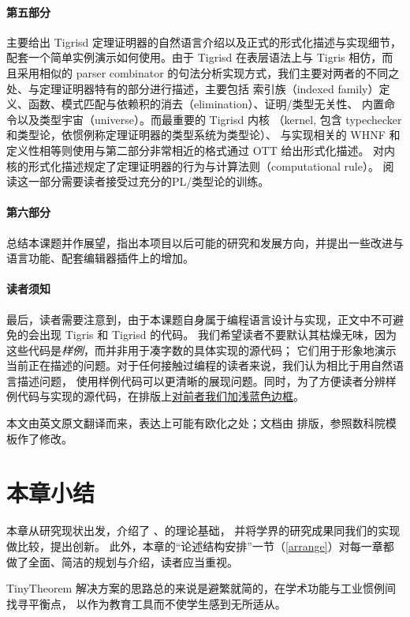 \paragraph{第五部分}主要给出 Tigrisd 定理证明器的自然语言介绍以及正式的形式化描述与实现细节，配套一个简单实例演示如何使用。由于 Tigrisd 在表层语法上与 Tigris 相仿，而且采用相似的
parser combinator 的句法分析实现方式，我们主要对两者的不同之处、与定理证明器特有的部分进行描述，主要包括
索引族（indexed family）定义、函数、模式匹配与依赖积的消去（elimination）、证明/类型无关性、
内置命令以及类型宇宙（universe）。而最重要的 Tigrisd 内核
（kernel, 包含 typechecker 和类型论，依惯例称定理证明器的类型系统为类型论）、
与实现相关的 WHNF 和定义性相等则使用与第二部分非常相近的格式通过 OTT 给出形式化描述。
对内核的形式化描述规定了定理证明器的行为与计算法则（computational rule）。
阅读这一部分需要读者接受过充分的PL/类型论的训练。

\paragraph{第六部分}总结本课题并作展望，指出本项目以后可能的研究和发展方向，并提出一些改进与语言功能、配套编辑器插件上的增加。

\paragraph{读者须知} 最后，读者需要注意到，由于本课题自身属于编程语言设计与实现，正文中不可避免的会出现 Tigris 和 Tigrisd 的代码。
我们希望读者不要默认其枯燥无味，因为这些代码是\emph{样例}，而并非用于凑字数的具体实现的源代码；
它们用于形象地演示当前正在描述的问题。对于任何接触过编程的读者来说，我们认为相比于用自然语言描述问题，
使用样例代码可以更清晰的展现问题。同时，为了方便读者分辨样例代码与实现的源代码，在排版上\underline{对前者我们加浅蓝色边框}。

本文由英文原文翻译而来，表达上可能有欧化之处；文档由 \XeLaTeX 排版，参照数科院模板作了修改。

\section{本章小结}
本章从研究现状出发，介绍了 \Tigris、\Tigrisd 的理论基础，
并将学界的研究成果同我们的实现做比较，提出创新。
此外，本章的“论述结构安排”一节（\ref{arrange}）对每一章都做了全面、简洁的规划与介绍，读者应当重视。

TinyTheorem 解决方案的思路总的来说是避繁就简的，在学术功能与工业惯例间找寻平衡点，
以作为教育工具而不使学生感到无所适从。

